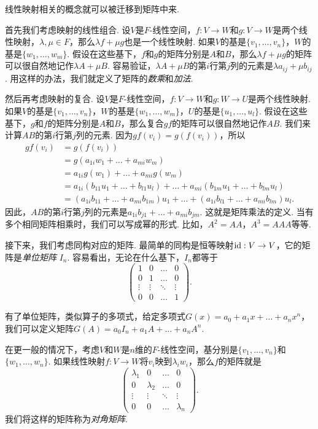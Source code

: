 线性映射相关的概念就可以被迁移到矩阵中来. 

首先我们考虑映射的线性组合. 设$V$是$F$-线性空间，$f:V\to W$和$g:V\to W$是两个线性映射，$\lambda,\mu\in F$，那么$\lambda f+\mu g$也是一个线性映射. 如果$V$的基是$\{v_1,\dots,v_n\}$，$W$的基是$\{w_1,\dots,w_m\}$. 假设在这些基下，$f$和$g$的矩阵分别是$A$和$B$，那么$\lambda f+\mu g$的矩阵可以很自然地记作$\lambda A+\mu B$. 容易验证，$\lambda A+\mu B$的第$i$行第$j$列的元素是$\lambda a_{ij}+\mu b_{ij}$. 用这样的办法，我们就定义了矩阵的\textit{数乘}和\textit{加法}. 


然后再考虑映射的复合. 设$V$是$F$-线性空间，$f:V\to W$和$g:W\to U$是两个线性映射. 如果$V$的基是$\{v_1,\dots,v_n\}$，$W$的基是$\{w_1,\dots,w_m\}$，$U$的基是$\{u_1,\dots,u_l\}$. 假设在这些基下，$g$和$f$的矩阵分别是$A$和$B$，那么复合$gf$的矩阵可以很自然地记作$AB$. 我们来计算$AB$的第$i$行第$j$列的元素. 因为$gf(v_i)=g(f(v_i))$，所以
\begin{align*}
    gf(v_i)&=g(f(v_i))\\
    &=g(a_{1i}w_1+\dots+a_{mi}w_m)\\
    &=a_{1i}g(w_1)+\dots+a_{mi}g(w_m)\\
    &=a_{1i}(b_{11}u_1+\dots+b_{l1}u_l)+\dots+a_{mi}(b_{1m}u_1+\dots+b_{lm}u_l)\\
    &=(a_{1i}b_{11}+\dots+a_{mi}b_{1m})u_1+\dots+(a_{1i}b_{l1}+\dots+a_{mi}b_{lm})u_l.
\end{align*}
因此，$AB$的第$i$行第$j$列的元素是$a_{1i}b_{j1}+\dots+a_{mi}b_{jm}$. 这就是矩阵乘法的定义. 当有多个相同矩阵相乘时，我们可以写成幂的形式. 比如，$A^2=AA$，$A^3=AAA$等等. 

接下来，我们考虑同构对应的矩阵. 最简单的同构是恒等映射$\mathrm{id}:V\to V$，它的矩阵是\textit{单位矩阵} $I_n$. 容易看出，无论在什么基下，$I_n$都等于
\[\begin{pmatrix}
1&0&\dots&0\\
0&1&\dots&0\\
\vdots&\vdots&\ddots&\vdots\\
0&0&\dots&1
\end{pmatrix}.\]

有了单位矩阵，类似算子的多项式，给定多项式$G(x)=a_0+a_1x+\dots+a_nx^n$，我们可以定义矩阵$G(A)=a_0I_n+a_1A+\dots+a_nA^n$. 

在更一般的情况下，考虑$V$和$W$是$n$维的$F$-线性空间，基分别是$\{v_1,\dots,v_n\}$和$\{w_1,\dots,w_n\}$. 如果线性映射$f:V\to W$将$v_i$映到$\lambda_i w_i$，那么$f$的矩阵就是
\[\begin{pmatrix}
\lambda_1&0&\dots&0\\
0&\lambda_2&\dots&0\\
\vdots&\vdots&\ddots&\vdots\\
0&0&\dots&\lambda_n
\end{pmatrix}.\]
我们将这样的矩阵称为\textit{对角矩阵}. 

